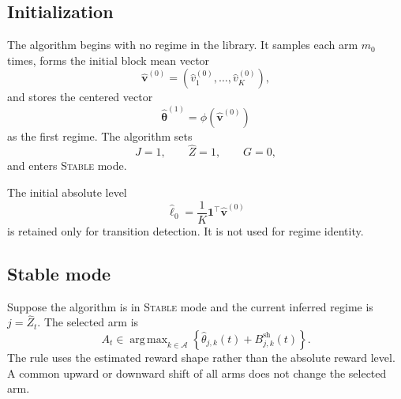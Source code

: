 \documentclass[11pt]{article}
\newcommand{\A}{\mathcal A}
\newcommand{\one}{\bm 1}
\DeclareMathOperator*{\argmax}{arg\,max}
\begin{document}
\subsection{Initialization}
\label{subsec:initialization}

The algorithm begins with no regime in the library. It samples each arm $m_0$ times, forms the initial block mean vector
\begin{equation}
\label{eq:init_vector}
\widehat{\bm v}^{(0)}
=
(\widehat v_1^{(0)},\ldots,\widehat v_K^{(0)}),
\end{equation}
and stores the centered vector
\begin{equation}
\label{eq:init_shape}
\widehat{\bm\theta}^{(1)}
=
\phi(\widehat{\bm v}^{(0)})
\end{equation}
as the first regime. The algorithm sets
\begin{equation}
\label{eq:init_state}
J=1,
\qquad
\widehat Z=1,
\qquad
G=0,
\end{equation}
and enters \textsc{Stable} mode.

The initial absolute level
\begin{equation}
\label{eq:init_level}
\widehat\ell_0=\frac{1}{K}\one^\top\widehat{\bm v}^{(0)}
\end{equation}
is retained only for transition detection. It is not used for regime identity.

\subsection{Stable mode}
\label{subsec:stable_mode}

Suppose the algorithm is in \textsc{Stable} mode and the current inferred regime is $j=\widehat Z_t$. The selected arm is
\begin{equation}
\label{eq:stable_shape_ucb_rule}
A_t
\in
\argmax_{k\in\A}
\left\{
\widehat\theta_{j,k}(t)+B_{j,k}^{\mathrm{sh}}(t)
\right\}.
\end{equation}
The rule uses the estimated reward shape rather than the absolute reward level. A common upward or downward shift of all arms does not change the selected arm.
\end{document}
